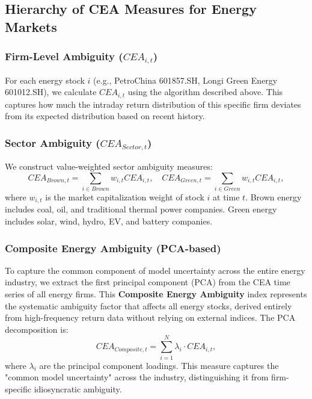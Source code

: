 \documentclass[preprint,12pt,authoryear]{elsarticle}
\begin{document}
\subsection{Hierarchy of CEA Measures for Energy Markets}

\subsubsection{Firm-Level Ambiguity ($CEA_{i,t}$)}

For each energy stock $i$ (e.g., PetroChina 601857.SH, Longi Green Energy 601012.SH), we calculate $CEA_{i,t}$ using the algorithm described above. This captures how much the intraday return distribution of this specific firm deviates from its expected distribution based on recent history.

\subsubsection{Sector Ambiguity ($CEA_{Sector,t}$)}

We construct value-weighted sector ambiguity measures:
\begin{equation}
CEA_{Brown,t} = \sum_{i \in Brown} w_{i,t} CEA_{i,t}, \quad CEA_{Green,t} = \sum_{i \in Green} w_{i,t} CEA_{i,t},
\end{equation}
where $w_{i,t}$ is the market capitalization weight of stock $i$ at time $t$. Brown energy includes coal, oil, and traditional thermal power companies. Green energy includes solar, wind, hydro, EV, and battery companies.

\subsubsection{Composite Energy Ambiguity (PCA-based)}

To capture the common component of model uncertainty across the entire energy industry, we extract the first principal component (PCA) from the CEA time series of all energy firms. This \textbf{Composite Energy Ambiguity} index represents the systematic ambiguity factor that affects all energy stocks, derived entirely from high-frequency return data without relying on external indices. The PCA decomposition is:
\begin{equation}
CEA_{Composite,t} = \sum_{i=1}^{N} \lambda_i \cdot CEA_{i,t},
\end{equation}
where $\lambda_i$ are the principal component loadings. This measure captures the "common model uncertainty" across the industry, distinguishing it from firm-specific idiosyncratic ambiguity.
\end{document}
